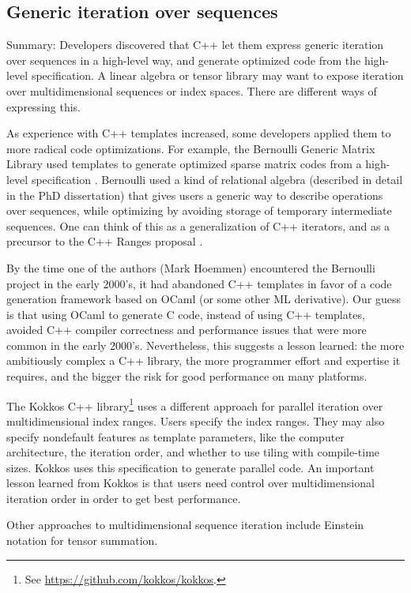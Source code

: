 \subsection{Generic iteration over sequences}
\label{SS:features:iteration}

Summary: Developers discovered that C++ let them express generic
iteration over sequences in a high-level way, and generate optimized
code from the high-level specification.  A linear algebra or tensor
library may want to expose iteration over multidimensional sequences
or index spaces.  There are different ways of expressing this.

As experience with C++ templates increased, some developers applied
them to more radical code optimizations.  For example, the Bernoulli
Generic Matrix Library used templates to generate optimized sparse
matrix codes from a high-level specification \cite{Ahmed2000}.
Bernoulli used a kind of relational algebra (described in detail in
the PhD dissertation) that gives users a generic way to describe
operations over sequences, while optimizing by avoiding storage of
temporary intermediate sequences.  One can think of this as a
generalization of C++ iterators, and as a precursor to the C++ Ranges
proposal \cite{Niebler2018}.

By the time one of the authors (Mark Hoemmen) encountered the
Bernoulli project in the early 2000's, it had abandoned C++ templates
in favor of a code generation framework based on OCaml (or some other
ML derivative).  Our guess is that using OCaml to generate C code,
instead of using C++ templates, avoided C++ compiler correctness and
performance issues that were more common in the early 2000's.
Nevertheless, this suggests a lesson learned: the more ambitiously
complex a C++ library, the more programmer effort and expertise it
requires, and the bigger the risk for good performance on many
platforms.

The Kokkos C++ library\footnote{See
  \url{https://github.com/kokkos/kokkos}.} uses a different approach
for parallel iteration over multidimensional index ranges.  Users
specify the index ranges.  They may also specify nondefault features
as template parameters, like the computer architecture, the iteration
order, and whether to use tiling with compile-time sizes.  Kokkos uses
this specification to generate parallel code.  An important lesson
learned from Kokkos is that users need control over multidimensional
iteration order in order to get best performance.

Other approaches to multidimensional sequence iteration include
Einstein notation for tensor summation.
%
% 

